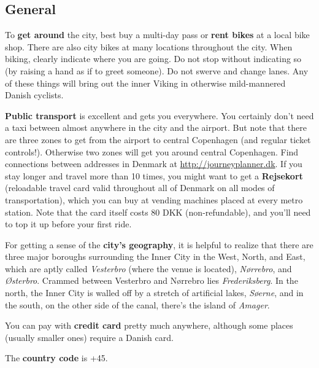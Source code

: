 \begin{left}







\section{General}

To \textbf{get around} the city, best buy a multi-day pass or \textbf{rent bikes} at a local bike shop. There are also city bikes at many locations throughout the city. When biking, clearly indicate where you are going. Do not stop without indicating so (by raising a hand as if to greet someone). Do not swerve and change lanes. Any of these things will bring out the inner Viking in otherwise mild-mannered Danish cyclists.

\textbf{Public transport} is excellent and gets you everywhere. You certainly don't need a taxi between almost anywhere in the city and the airport. But note that there are three zones to get from the airport to central Copenhagen (and regular ticket controls!). Otherwise two zones will get you around central Copenhagen. Find connections between addresses in Denmark at \url{http://journeyplanner.dk}. If you stay longer and travel more than 10 times, you might want to get a \textbf{Rejsekort} (reloadable travel card valid throughout all of Denmark on all modes of transportation), which you can buy at vending machines placed at every metro station. Note that the card itself costs 80 DKK (non-refundable), and you’ll need to top it up before your first ride.
\par
For getting a sense of the \textbf{city’s geography}, it is helpful to realize that there are three major boroughs surrounding the Inner City in the West, North, and East, which are aptly called \textit{Vesterbro} (where the venue is located), \textit{Nørrebro}, and \textit{Østerbro}. Crammed between Vesterbro and Nørrebro lies \textit{Frederiksberg}. In the north, the Inner City is walled off by a stretch of artificial lakes, \textit{Søerne}, and in the south, on the other side of the canal, there’s the island of \textit{Amager}. 
\par
You can pay with \textbf{credit card} pretty much anywhere, although some places (usually smaller ones) require a Danish card.
\par
The \textbf{country code} is +45.



\end{left}
